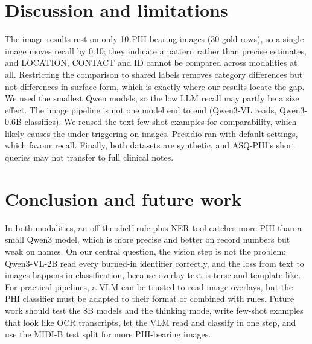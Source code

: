 \documentclass[11pt,a4paper]{article}
\begin{document}
\section{Discussion and limitations}

The image results rest on only 10 PHI-bearing images (30 gold rows), so a single image moves recall by 0.10; they indicate a pattern rather than precise estimates, and LOCATION, CONTACT and ID cannot be compared across modalities at all. Restricting the comparison to shared labels removes category differences but not differences in surface form, which is exactly where our results locate the gap. We used the smallest Qwen models, so the low LLM recall may partly be a size effect. The image pipeline is not one model end to end (Qwen3-VL reads, Qwen3-0.6B classifies). We reused the text few-shot examples for comparability, which likely causes the under-triggering on images. Presidio ran with default settings, which favour recall. Finally, both datasets are synthetic, and ASQ-PHI's short queries may not transfer to full clinical notes.

\section{Conclusion and future work}

In both modalities, an off-the-shelf rule-plus-NER tool catches more PHI than a small Qwen3 model, which is more precise and better on record numbers but weak on names. On our central question, the vision step is not the problem: Qwen3-VL-2B read every burned-in identifier correctly, and the loss from text to images happens in classification, because overlay text is terse and template-like. For practical pipelines, a VLM can be trusted to read image overlays, but the PHI classifier must be adapted to their format or combined with rules. Future work should test the 8B models and the thinking mode, write few-shot examples that look like OCR transcripts, let the VLM read and classify in one step, and use the MIDI-B test split for more PHI-bearing images.
\end{document}
